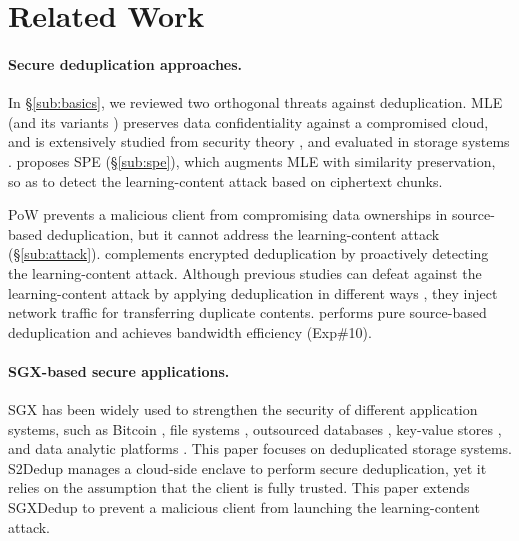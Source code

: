 \section{Related Work}
\label{sec:related-work}

\paragraph{Secure deduplication approaches.}
In \S\ref{sub:basics}, we reviewed two orthogonal threats against deduplication. MLE (and its variants \cite{bellare13a, bellare13b, douceur02, li15}) preserves data confidentiality against a compromised cloud, and is extensively studied from security theory \cite{bellare15, abadi13}, and evaluated in storage systems \cite{cox02, adya02, bellare13b, armknecht15, shah15, li15, li19, qin17, li20a, ren21}. \sysnameF proposes SPE (\S\ref{sub:spe}), which augments MLE with similarity preservation, so as  to  detect the learning-content attack based on ciphertext chunks.


PoW prevents a malicious  client from compromising data ownerships in source-based deduplication, but it cannot address the learning-content attack (\S\ref{sub:attack}). \sysnameF complements encrypted deduplication \cite{ren21} by proactively detecting the learning-content attack. Although previous studies can defeat against the learning-content attack by applying deduplication in different ways \cite{harnik10, li15}, they inject network traffic for transferring duplicate contents. \sysnameF performs  pure source-based deduplication and achieves bandwidth efficiency (Exp\#10).





\paragraph{SGX-based secure applications.}
SGX has been widely used to strengthen the security of different application systems, such as Bitcoin \cite{matetic19}, file systems \cite{ahmad18, shinde20}, outsourced databases \cite{eskandarian17, priebe18, sun21}, key-value stores \cite{mishra18, bailleu19, kim19, bailleu21}, and data analytic platforms \cite{schuster15, zheng17, bowe20}. This paper focuses on deduplicated storage systems. S2Dedup \cite{miranda21} manages a cloud-side enclave to perform secure deduplication, yet it relies on the assumption that the client is fully trusted. This paper extends SGXDedup \cite{ren21} to prevent a malicious client from launching the learning-content attack.



